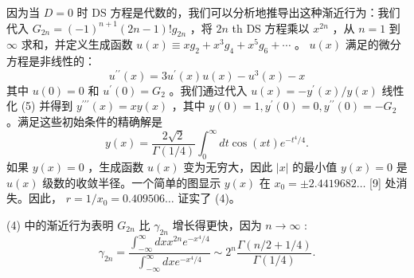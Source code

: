 \documentclass[UTF8]{article}
\begin{document}
因为当  \( D=0 \)  时 DS 方程是代数的，我们可以分析地推导出这种渐近行为：我们代入  \( G_{2 n}=(-1)^{n+1}(2 n-1) ! g_{2 n} \)  ，将  \( 2 n \)  th DS 方程乘以  \( x^{2 n} \)  ，从  \( n=1 \)  到  \( \infty \)  求和，并定义生成函数  \( u(x) \equiv x g_{2}+x^{3} g_{4}+x^{5} g_{6}+\cdots \)  。  \( u(x) \)  满足的微分方程是非线性的：  \[u^{\prime \prime}(x)=3 u^{\prime}(x) u(x)-u^{3}(x)-x
\]  其中  \( u(0)=0 \)  和  \( u^{\prime}(0)=G_{2} \)  。我们通过代入  \( u(x)=-y^{\prime}(x) / y(x) \)  线性化 (5) 并得到  \( y^{\prime \prime \prime}(x)=x y(x) \)  ，其中  \( y(0)=1, y^{\prime}(0)=0, y^{\prime \prime}(0)=-G_{2} \)  。满足这些初始条件的精确解是  \[y(x)=\frac{2 \sqrt{2}}{\Gamma(1 / 4)} \int_{0}^{\infty} d t \cos (x t) e^{-t^{4} / 4} .
\]  如果  \( y(x)=0 \)  ，生成函数  \( u(x) \)  变为无穷大，因此  \( |x| \)  的最小值  \( y(x)=0 \)  是  \( u(x) \)  级数的收敛半径。一个简单的图显示  \( y(x) \)  在  \( x_{0}= \pm 2.4419682 \ldots \)  [9] 处消失。因此，  \( r=1 / x_{0}=0.409506 \ldots \)  证实了 (4)。

(4) 中的渐近行为表明  \( G_{2 n} \)  比  \( \gamma_{2 n} \)  增长得更快，因为  \( n \rightarrow \infty \)  :  \[
\gamma_{2 n}=\frac{\int_{-\infty}^{\infty} d x x^{2 n} e^{-x^{4} / 4}}{\int_{-\infty}^{\infty} d x e^{-x^{4} / 4}} \sim 2^{n} \frac{\Gamma(n / 2+1 / 4)}{\Gamma(1 / 4)} .
\] 
\end{document}
